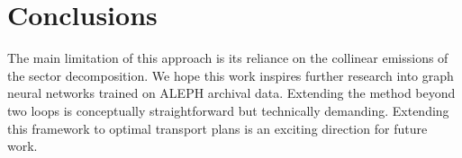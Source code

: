 \section{Conclusions}\label{sec:conclusions}

The main limitation of this approach is its reliance on the collinear
emissions of the sector decomposition. We hope this work inspires
further research into graph neural networks trained on ALEPH archival
data. Extending the method beyond two loops is conceptually
straightforward but technically demanding. Extending this framework to
optimal transport plans is an exciting direction for future work.


